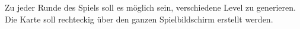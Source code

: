 Zu jeder Runde des Spiels soll es möglich sein, verschiedene Level zu generieren.
Die Karte soll rechteckig über den ganzen Spielbildschirm erstellt werden. 